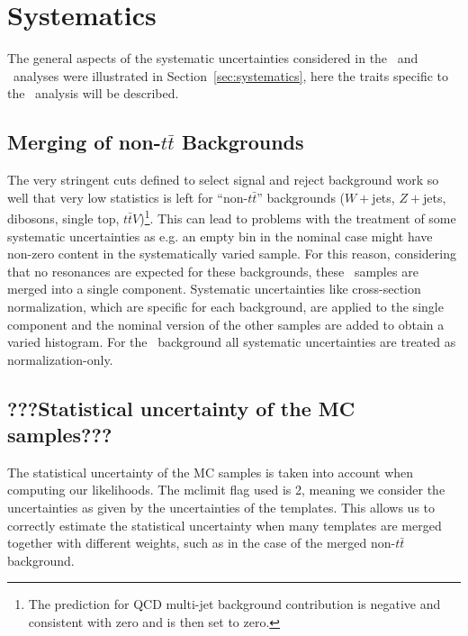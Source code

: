 \section{Systematics}\label{sec:wbxSYS}

The general aspects of the systematic uncertainties considered
in the \wbx\ and \htx\ analyses were illustrated
in Section~\ref{sec:systematics}, here the traits specific to the
\wbx\ analysis will be described.

\subsection{Merging of non-$t\bar{t}$ Backgrounds}

The very stringent cuts defined to select signal and reject
background work so well that very low statistics is left for
``non-$t\bar{t}$'' backgrounds ($W+$jets, $Z+$jets, dibosons, single top, 
$t\bar{t}V$)\footnote{The prediction for QCD multi-jet background contribution
is negative and consistent with zero and is then set to zero.}.
This can lead to problems with the treatment of some systematic uncertainties as
e.g. an empty bin in the nominal case might have non-zero content in the
systematically varied sample. For this reason, considering that no resonances
are expected for these backgrounds, these \nontt\ samples are merged into
a single component. Systematic uncertainties like cross-section normalization,
which are specific for each background, are applied to the single component
and the nominal version of the other samples are added to obtain
a varied histogram.
For the \nontt\ background all systematic uncertainties are
treated as normalization-only.


\subsection{???Statistical uncertainty of the MC samples???}

The statistical uncertainty of the MC samples is taken into account when computing our likelihoods.
The {\sc mclimit} flag used is 2, meaning we consider the uncertainties as given by the uncertainties of the templates. 
This allows us to correctly estimate the statistical uncertainty when many templates are merged together with different weights, such as in
the case of the merged non-$t\bar{t}$ background.

